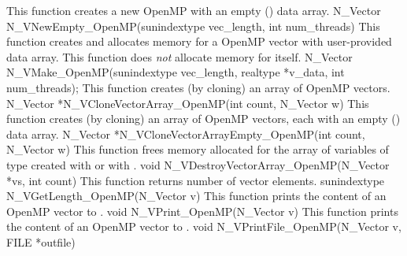 
{
  This function creates a new OpenMP  with an empty () data array.
}
{ 
  N\_Vector N\_VNewEmpty\_OpenMP(sunindextype vec\_length, int num\_threads)
}
{
 This function creates and allocates memory for a OpenMP vector
 with user-provided data array. This function does {\em not} allocate memory for
  itself.
}
{
  N\_Vector N\_VMake\_OpenMP(sunindextype vec\_length, realtype *v\_data,
  int num\_threads);
}
{
  This function creates (by cloning) an array of  OpenMP vectors.
}
{
  N\_Vector *N\_VCloneVectorArray\_OpenMP(int count, N\_Vector w)
}
{
  This function creates (by cloning) an array of  OpenMP vectors, each with an
  empty () data array.
}
{
  N\_Vector *N\_VCloneVectorArrayEmpty\_OpenMP(int count, N\_Vector w)
}
{
  This function frees memory allocated for the array of  variables of type
   created with  or with
  .
}
{
 void N\_VDestroyVectorArray\_OpenMP(N\_Vector *vs, int count)
}
{
  This function returns number of vector elements.
}
{
  sunindextype N\_VGetLength\_OpenMP(N\_Vector v)
}
{
  This function prints the content of an OpenMP vector to .
}
{
  void N\_VPrint\_OpenMP(N\_Vector v)
}
{
  This function prints the content of an OpenMP vector to .
}
{
  void N\_VPrintFile\_OpenMP(N\_Vector v, FILE *outfile)
}


